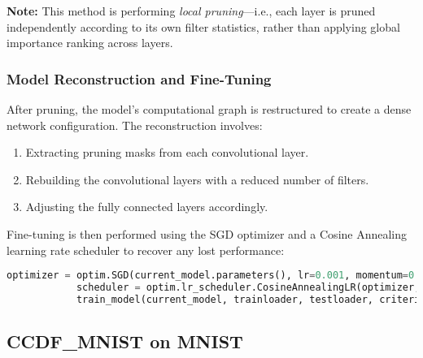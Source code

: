             \noindent
            \textbf{Note:} This method is performing \textit{local pruning}—i.e., each layer is pruned independently according to its own filter statistics, rather than applying global importance ranking across layers.
        
        
        \subsubsection{Model Reconstruction and Fine-Tuning}
            After pruning, the model’s computational graph is restructured to create a dense network configuration. The reconstruction involves:
            \begin{enumerate}
                \item Extracting pruning masks from each convolutional layer.
                \item Rebuilding the convolutional layers with a reduced number of filters.
                \item Adjusting the fully connected layers accordingly.
            \end{enumerate}
            
            Fine-tuning is then performed using the SGD optimizer and a Cosine Annealing learning rate scheduler to recover any lost performance:
            \begin{lstlisting}[caption={Model Fine-Tuning Code Snippet}, language=Python]
            optimizer = optim.SGD(current_model.parameters(), lr=0.001, momentum=0.9, weight_decay=5e-4)
            scheduler = optim.lr_scheduler.CosineAnnealingLR(optimizer, T_max=3, eta_min=1e-6)
            train_model(current_model, trainloader, testloader, criterion, optimizer, scheduler, epochs=5)
            \end{lstlisting}
        
        
        
        
        
        
        
        
        
        
        
    
    
    
    \subsection{CCDF\_MNIST on MNIST}

